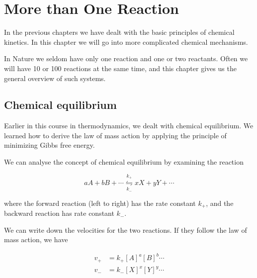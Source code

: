 
\chapter{More than One Reaction}
\label{chap:complexReactions}

In the previous chapters we have dealt with the basic principles of chemical kinetics. In this chapter we will go into more complicated chemical mechanisms.

In Nature we seldom have only one reaction and one or two reactants. Often we will have 10 or 100 reactions at the same time, and this chapter gives us the general overview of such systems.

\section{Chemical equilibrium}
\label{sect:ChemEquilibrium}

Earlier in this course in thermodynamics, we dealt with chemical equilibrium. We learned how to derive the law of mass action by applying the principle of minimizing Gibbs free energy.

We can analyse the concept of chemical equilibrium by examining the reaction

\begin{equation}
    aA + bB + \cdots \overset{k_+}{\underset{k_-}{\leftrightharpoons}} xX + yY + \cdots
\end{equation}

where the forward reaction (left to right) has the rate constant $k_+$, and the backward reaction has rate constant $k_-$.

We can write down the velocities for the two reactions. If they follow the law of mass action, we have

\begin{subequations}
\begin{align}
    v_+ &= k_+ [A]^a[B]^b \cdots \\
    v_- &= k_- [X]^x[Y]^y \cdots
\end{align}
\end{subequations}

